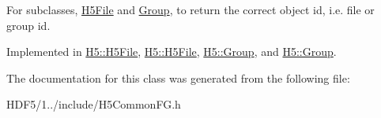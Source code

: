For subclasses, \hyperlink{class_h5_1_1_h5_file}{H5\+File} and \hyperlink{class_h5_1_1_group}{Group}, to return the correct object id, i.\+e. file or group id. 

Implemented in \hyperlink{class_h5_1_1_h5_file_ab1c5775703262ac913dd164e77d60abc}{H5\+::\+H5\+File}, \hyperlink{class_h5_1_1_h5_file_ab1c5775703262ac913dd164e77d60abc}{H5\+::\+H5\+File}, \hyperlink{class_h5_1_1_group_ae8fa39e9d934d254cd1bc2302a7e6391}{H5\+::\+Group}, and \hyperlink{class_h5_1_1_group_ae8fa39e9d934d254cd1bc2302a7e6391}{H5\+::\+Group}.



The documentation for this class was generated from the following file\+:\begin{DoxyCompactItemize}
\item 
H\+D\+F5/1../include/\+H5\+Common\+F\+G.\+h\end{DoxyCompactItemize}
